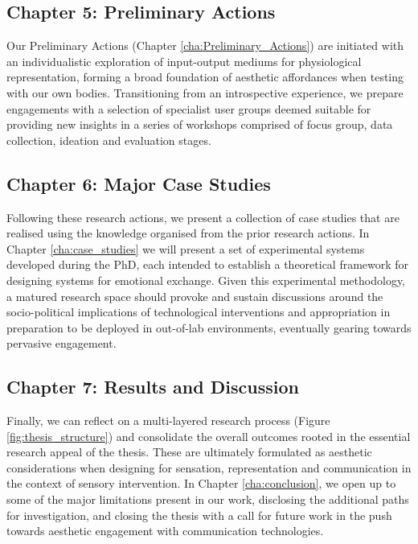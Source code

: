 \subsection*{Chapter 5: Preliminary Actions}

Our Preliminary Actions (Chapter \ref{cha:Preliminary_Actions}) are initiated with an individualistic exploration of input-output mediums for physiological representation, forming a broad foundation of aesthetic affordances when testing with our own bodies. Transitioning from an introspective experience, we prepare engagements with a selection of specialist user groups deemed suitable for providing new insights in a series of workshops comprised of focus group, data collection, ideation and evaluation stages.

\subsection*{Chapter 6: Major Case Studies}

Following these research actions, we present a collection of case studies that are realised using the knowledge organised from the prior research actions. In Chapter \ref{cha:case_studies} we will present a set of experimental systems developed during the PhD, each intended to establish a theoretical framework for designing systems for emotional exchange. Given this experimental methodology, a matured research space should provoke and sustain discussions around the socio-political implications of technological interventions and appropriation in preparation to be deployed in out-of-lab environments, eventually gearing towards pervasive engagement.

\subsection*{Chapter 7: Results and Discussion}

Finally, we can reflect on a multi-layered research process (Figure \ref{fig:thesis_structure}) and consolidate the overall outcomes rooted in the essential research appeal of the thesis. These are ultimately formulated as aesthetic considerations when designing for sensation, representation and communication in the context of sensory intervention. In Chapter \ref{cha:conclusion}, we open up to some of the major limitations present in our work, disclosing the additional paths for investigation, and closing the thesis with a call for future work in the push towards aesthetic engagement with communication technologies.


